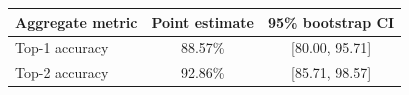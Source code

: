 \begin{tabular}{lcc}
\toprule
Aggregate metric & Point estimate & 95\% bootstrap CI \\
\midrule
Top-1 accuracy & 88.57\% & [80.00, 95.71] \\
Top-2 accuracy & 92.86\% & [85.71, 98.57] \\
\bottomrule
\end{tabular}
